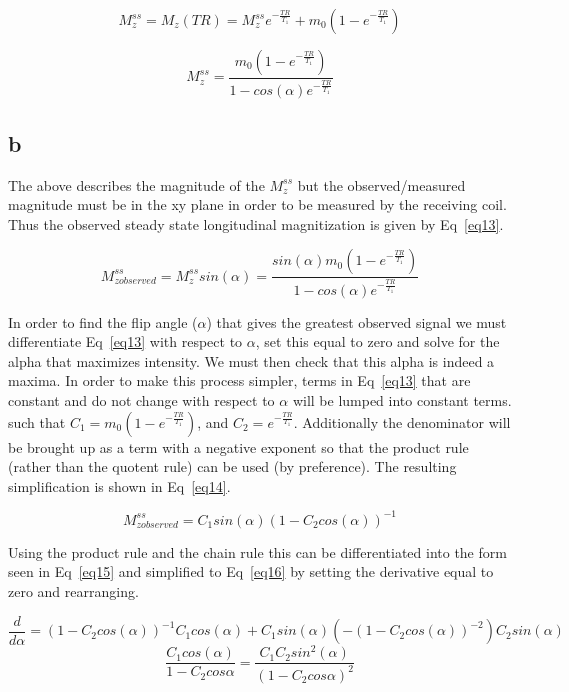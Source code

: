 \documentclass[12pt]{article}
\begin{document}
\begin{equation}
M_z^{ss} = M_z(TR) = M_z^{ss}  e^{-\frac{TR}{T_1}} + m_0(1-e^{-\frac{TR}{T_1}})
\label{eq11}
\end{equation}

\begin{equation}
M_z^{ss} =\frac{m_0(1-e^{-\frac{TR}{T_1}})}{1- cos(\alpha)e^{-\frac{TR}{T_1}}}
\label{eq12}
\end{equation}

\subsection{b}
The above describes the magnitude of the $M_z^{ss}$ but the observed/measured magnitude must be in the xy plane in order to be measured by the receiving coil. Thus the observed steady state longitudinal magnitization is given by Eq~\ref{eq13}.

\begin{equation}
M_{zobserved}^{ss} =M_{z}^{ss}sin(\alpha) = \frac{sin(\alpha)m_0(1-e^{-\frac{TR}{T_1}})}{1- cos(\alpha)e^{-\frac{TR}{T_1}}}
\label{eq13}
\end{equation}

In order to find the flip angle ($\alpha$) that gives the greatest observed signal we must differentiate Eq~\ref{eq13} with respect to $\alpha$, set this equal to zero and solve for the alpha that maximizes intensity. We must then check that this alpha is indeed a maxima. In order to make this process simpler, terms in Eq~\ref{eq13} that are constant and do not change with respect to $\alpha$ will be lumped into constant terms. such that $C_1 = m_0(1-e^{-\frac{TR}{T_1}})$, and $C_2 = e^{-\frac{TR}{T_1}}$. Additionally the denominator will be brought up as a term with a negative exponent so that the product rule (rather than the quotent rule) can be used (by preference). The resulting simplification is shown in Eq~\ref{eq14}.

\begin{equation}
M_{zobserved}^{ss} = C_1sin(\alpha)(1- C_2cos(\alpha))^{-1}
\label{eq14}
\end{equation}

Using the product rule and the chain rule this can be differentiated into the form seen in Eq~\ref{eq15} and simplified to Eq~\ref{eq16} by setting the derivative equal to zero and rearranging.

\begin{equation}
\frac{d}{d\alpha} = (1- C_2cos(\alpha))^{-1} C_1cos(\alpha) + C_1sin(\alpha)(-(1- C_2cos(\alpha))^{-2})C_2sin(\alpha)
\label{eq15}
\end{equation}
\begin{equation}
\frac{C_1cos(\alpha)}{1-C_2cos{\alpha}} = \frac{C_1C_2sin^2(\alpha)}{(1-C_2cos{\alpha})^2}
\label{eq16}
\end{equation}
\end{document}
